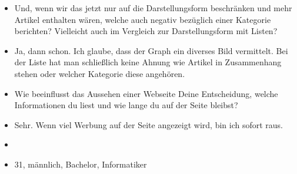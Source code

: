{\begin{itemize}[]
            \item {} Und, wenn wir das jetzt nur auf die Darstellungsform beschränken und mehr Artikel enthalten wären, welche auch negativ bezüglich einer Kategorie berichten?
                  Vielleicht auch im Vergleich zur Darstellungsform mit Listen?
            \item {} Ja, dann schon. Ich glaube, dass der Graph ein diverses Bild vermittelt.
                  Bei der Liste hat man schließlich keine Ahnung wie Artikel in Zusammenhang stehen oder welcher Kategorie diese angehören.
            \item {} Wie beeinflusst das Aussehen einer Webseite Deine Entscheidung, welche Informationen du liest und wie lange du auf der Seite bleibst?
            \item {} Sehr. Wenn viel Werbung auf der Seite angezeigt wird, bin ich sofort raus.
            \item {}
            \item {} 31, männlich, Bachelor, Informatiker
      \end{itemize}}
\nolinenumbers
